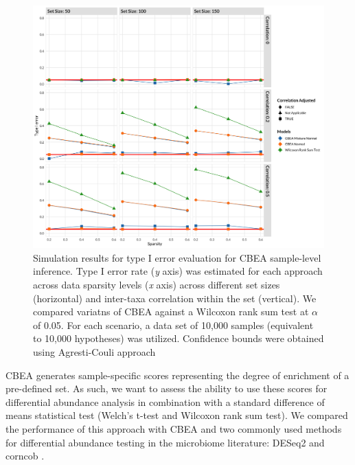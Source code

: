 \documentclass{article}
\begin{document}
\begin{figure}[!h]
    \centering
    \includegraphics[width=\textwidth]{figures/sim_ss_fdr.png}
    \caption{Simulation results for type I error evaluation for CBEA sample-level inference. Type I error rate (\emph{y} axis) was estimated for each approach across data sparsity levels (\emph{x} axis) across different set sizes (horizontal) and inter-taxa correlation within the set (vertical). We compared variatns of CBEA against a Wilcoxon rank sum test at $\alpha$ of 0.05. For each scenario, a data set of 10,000 samples (equivalent to 10,000 hypotheses) was utilized. Confidence bounds were obtained using Agresti-Couli \cite{agresti1998} approach}
    \label{fig:s1}
\end{figure}

CBEA generates sample-specific scores representing the degree of enrichment of a pre-defined set. As such, we want to assess the ability to use these scores for differential abundance analysis in combination with a standard difference of means statistical test (Welch's t-test and Wilcoxon rank sum test). We compared the performance of this approach with CBEA and two commonly used methods for differential abundance testing in the microbiome literature: DESeq2 \cite{love2014} and corncob \cite{martin2020}.   
\end{document}
